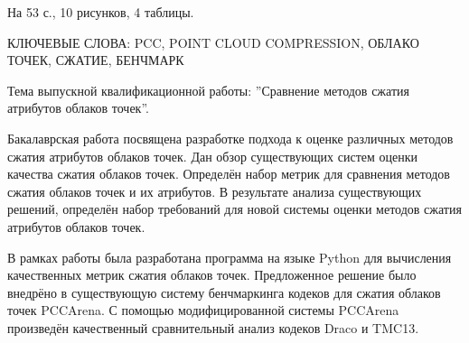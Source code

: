 На 53 с., 10 рисунков, 4 таблицы.

КЛЮЧЕВЫЕ СЛОВА: PCC, POINT CLOUD COMPRESSION, ОБЛАКО ТОЧЕК, СЖАТИЕ, БЕНЧМАРК

Тема выпускной квалификационной работы: ''Сравнение методов сжатия атрибутов
облаков точек''.

Бакалаврская работа посвящена разработке подхода к оценке различных методов
сжатия атрибутов облаков точек. Дан обзор существующих систем оценки качества
сжатия облаков точек. Определён набор метрик для сравнения методов сжатия
облаков точек и их атрибутов. В результате анализа существующих решений,
определён набор требований для новой системы оценки методов сжатия атрибутов
облаков точек.

В рамках работы была разработана программа на языке Python для вычисления
качественных метрик сжатия облаков точек. Предложенное решение было внедрёно в
существующую систему бенчмаркинга кодеков для сжатия облаков точек PCCArena. С
помощью модифицированной системы PCCArena произведён качественный сравнительный
анализ кодеков Draco и TMC13.
